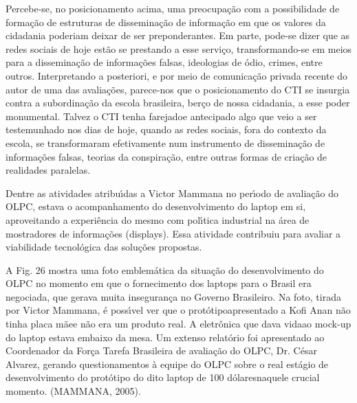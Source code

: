 \documentclass[
12pt,		%
openright,	%
twoside,  %
a4paper,			%
chapter=TITLE,		%
english,			%
french,				%
spanish,			%
brazil				%
]{USPSC-classe/USPSC}
\begin{document}
Percebe-se, no posicionamento acima, uma preocupa\c{c}\~ao com a possibilidade de forma\c{c}\~ao de estruturas de dissemina\c{c}\~ao de informa\c{c}\~ao em que os valores da cidadania poderiam deixar de ser preponderantes. Em parte, pode-se dizer que as redes sociais de hoje est\~ao se prestando a esse servi\c{c}o, transformando-se em meios para a dissemina\c{c}\~ao de informa\c{c}\~oes falsas, ideologias de \'odio, crimes, entre outros. Interpretando a posteriori, e por meio de comunica\c{c}\~ao privada recente do autor de uma das avalia\c{c}\~oes, parece-nos que o posicionamento do CTI se insurgia contra a subordina\c{c}\~ao da escola brasileira, ber\c{c}o de nossa cidadania, a esse poder monumental. Talvez o CTI tenha \textquotedbl farejado\textquotedbl  e antecipado algo que veio a ser testemunhado nos dias de hoje, quando as redes sociais, fora do contexto da escola, se transformaram efetivamente num instrumento de dissemina\c{c}\~ao de informa\c{c}\~oes falsas, teorias da conspira\c{c}\~ao, entre outras formas de cria\c{c}\~ao de realidades paralelas.








Dentre as atividades atribu\'{\i}das a Victor Mammana no per\'{\i}odo de avalia\c{c}\~ao do OLPC, estava o acompanhamento do desenvolvimento do laptop em si, aproveitando a experi\^encia do mesmo com pol\'{\i}tica industrial na \'area de mostradores de informa\c{c}\~oes (displays). Essa atividade contribuiu para avaliar a viabilidade tecnol\'ogica das solu\c{c}\~oes propostas.








A Fig. 26 mostra uma foto emblem\'atica da situa\c{c}\~ao do desenvolvimento do OLPC no momento em que o fornecimento dos laptops para o Brasil era negociada, que gerava muita inseguran\c{c}a no Governo Brasileiro. Na foto, tirada por Victor Mammana, \'e poss\'{\i}vel ver que o \textquotedbl prot\'otipo\textquotedbl  apresentado a Kofi Anan n\~ao tinha \textquotedbl placa m\~ae\textquotedbl  e n\~ao era um produto real. A eletr\^onica que \textquotedbl dava vida\textquotedbl  ao mock-up do laptop estava embaixo da mesa. Um extenso relat\'orio foi apresentado ao Coordenador da For\c{c}a Tarefa Brasileira de avalia\c{c}\~ao do OLPC, Dr. C\'esar Alvarez, gerando questionamentos \`a equipe do OLPC sobre o real est\'agio de desenvolvimento do prot\'otipo do dito \textquotedbl laptop de 100 d\'olares\textquotedbl  naquele crucial momento. (MAMMANA, 2005).
\end{document}
